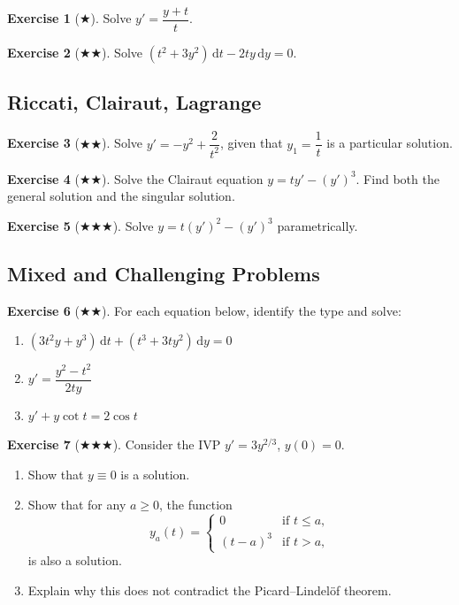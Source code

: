 \documentclass[12pt,a4paper,openany]{book}
\theoremstyle{definition}
\newtheorem{exercise}{Exercise}[chapter]
\theoremstyle{plain}
\theoremstyle{remark}
\newcommand{\dd}{\mathrm{d}}
\begin{document}
\begin{exercise}[$\bigstar$]
\label{exer:ch2-hom1}
Solve $y' = \dfrac{y+t}{t}$.
\end{exercise}

\begin{exercise}[$\bigstar\bigstar$]
\label{exer:ch2-hom2}
Solve $(t^2 + 3y^2)\,\dd t - 2ty\,\dd y = 0$.
\end{exercise}

\subsection*{Riccati, Clairaut, Lagrange}

\begin{exercise}[$\bigstar\bigstar$]
\label{exer:ch2-ric1}
Solve $y' = -y^2 + \dfrac{2}{t^2}$, given that $y_1 = \dfrac{1}{t}$ is a particular solution.
\end{exercise}

\begin{exercise}[$\bigstar\bigstar$]
\label{exer:ch2-clair1}
Solve the Clairaut equation $y = ty' - (y')^3$. Find both the general solution and the singular solution.
\end{exercise}

\begin{exercise}[$\bigstar\bigstar\bigstar$]
\label{exer:ch2-lag1}
Solve $y = t(y')^2 - (y')^3$ parametrically.
\end{exercise}

\subsection*{Mixed and Challenging Problems}

\begin{exercise}[$\bigstar\bigstar$]
\label{exer:ch2-mixed1}
For each equation below, identify the type and solve:
\begin{enumerate}[label=(\alph*)]
  \item $(3t^2 y + y^3)\,\dd t + (t^3 + 3ty^2)\,\dd y = 0$
  \item $y' = \dfrac{y^2 - t^2}{2ty}$
  \item $y' + y\cot t = 2\cos t$
\end{enumerate}
\end{exercise}

\begin{exercise}[$\bigstar\bigstar\bigstar$]
\label{exer:ch2-existence}
Consider the IVP $y' = 3y^{2/3}$, $y(0) = 0$.
\begin{enumerate}[label=(\alph*)]
  \item Show that $y \equiv 0$ is a solution.
  \item Show that for any $a \ge 0$, the function
    \[
      y_a(t) = \begin{cases} 0 & \text{if } t \le a, \\ (t-a)^3 & \text{if } t > a, \end{cases}
    \]
    is also a solution.
  \item Explain why this does not contradict the Picard--Lindel\"of theorem.
\end{enumerate}
\end{exercise}
\end{document}

